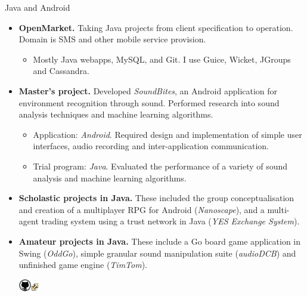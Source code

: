 \documentclass[10pt]{article} %
\newenvironment{indented}[1]%
{\begin{list}{}%
  {\setlength{\leftmargin}{#1}}%
  \item[]%
}
{\end{list}}
\begin{document}
\begin{minipage}[t]{0.5\textwidth}

{\raggedright\large Java and Android\\}

\normalsize{
\begin{itemize}
  \item \textbf{OpenMarket.} Taking Java projects from client specification to operation. Domain is SMS and other mobile service provision.
  \begin{itemize}
      \item Mostly Java webapps, MySQL, and Git. I use Guice, Wicket, JGroups and Cassandra.
  \end{itemize}
  \item \textbf{Master's project.} Developed \textit{SoundBites}, an Android application for environment recognition through sound. Performed research into sound analysis techniques and machine learning algorithms.
  \begin{itemize}
    \item Application: \emph{Android}. Required design and implementation of simple user interfaces, audio recording and inter-application communication.
    \item Trial program: \emph{Java}. Evaluated the performance of a variety of sound analysis and machine learning algorithms.
  \end{itemize}
  \item \textbf{Scholastic projects in Java.} These included the group conceptualisation and creation of a multiplayer RPG for Android (\emph{Nanoscape}), and a multi-agent trading system using a trust network in Java (\emph{YES Exchange System}).
  \item \textbf{Amateur projects in Java.} These include a Go board game application in Swing (\emph{OddGo}), simple granular sound manipulation suite (\emph{audioDCB}) and unfinished game engine (\emph{TimTom}). \parbox[top][10pt][t]{100pt}{\href{http://github.com/williamberg}{\includegraphics[height=15pt]{res/github}\includegraphics[width=10pt]{res/external_link}}}
\end{itemize}
}


\end{minipage}
\end{document}
